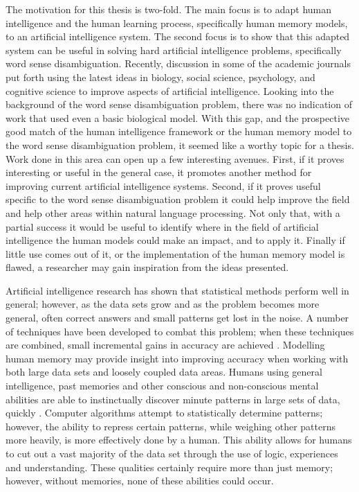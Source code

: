 The motivation for this thesis is two-fold.  The main focus is to adapt human
intelligence and the human learning process, specifically human memory models,
to an artificial intelligence system.  The second focus is to show that this
adapted system can be useful in solving hard artificial intelligence problems,
specifically word sense disambiguation.  Recently, discussion in some of the
academic journals put forth using the latest ideas in biology, social science,
psychology, and cognitive science to improve aspects of artificial intelligence.
Looking into the background of the word sense disambiguation problem, there was
no indication of work that used even a basic biological model. With this gap,
and the prospective good match of the human intelligence framework or the human
memory model to the word sense disambiguation problem, it seemed like a worthy
topic for a thesis.  Work done in this area can open up a few interesting
avenues. First, if it proves interesting or useful in the general case, it
promotes another method for improving current artificial intelligence systems.
Second, if it proves useful specific to the word sense disambiguation problem it
could help improve the field and help other areas within natural language
processing.  Not only that, with a partial success it would be useful to
identify where in the field of artificial intelligence the human models could
make an impact, and to apply it.  Finally if little use comes out of it, or the
implementation of the human memory model is flawed, a researcher may gain
inspiration from the ideas presented.

Artificial intelligence research has shown that statistical methods perform well
in general; however, as the data sets grow and as the problem becomes more general, 
often correct answers and small patterns get lost in the noise.  A number of techniques have been developed
to combat this problem; when these techniques are combined, small incremental
gains in accuracy are achieved \cite{ENSEMBLE2}.  Modelling human memory may
provide insight into improving accuracy when working with both large data sets
and loosely coupled data areas.  Humans using general intelligence, past
memories and other conscious and non-conscious mental abilities are able to
instinctually discover minute patterns in large sets of data, quickly
\cite{BLINK}.  Computer algorithms attempt to statistically determine patterns;
however, the ability to repress certain patterns, while weighing other patterns
more heavily, is more effectively done by a human.  This ability allows for
humans to cut out a vast majority of the data set through the use of logic,
experiences and understanding.  These qualities certainly require more than just
memory; however, without memories, none of these abilities could occur.

